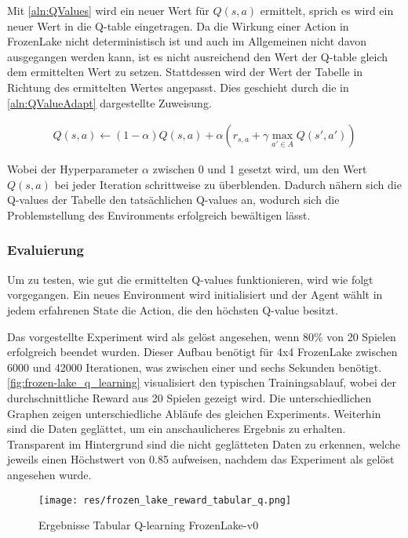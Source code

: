 \documentclass[11pt]{scrartcl}
\begin{document}
Mit \autoref{aln:QValues} wird ein neuer Wert für $Q(s, a)$ ermittelt, sprich es wird ein
neuer Wert in die Q-table eingetragen. Da die Wirkung einer Action in FrozenLake nicht
deterministisch ist und auch im Allgemeinen nicht davon ausgegangen werden kann, ist es
nicht ausreichend den Wert der Q-table gleich dem ermittelten Wert zu setzen. Stattdessen
wird der Wert der Tabelle in Richtung des ermittelten Wertes angepasst. Dies geschieht durch 
die in \autoref{aln:QValueAdapt} dargestellte Zuweisung.

\begin{align}
  Q(s, a) \leftarrow (1 - \alpha)Q(s, a) +
  \alpha(r_{s, a} + \gamma \max_{a'\in A}Q(s', a'))
\label{aln:QValueAdapt}
\end{align}
\noindent

Wobei der Hyperparameter $\alpha$ zwischen 0 und 1 gesetzt wird, um den Wert $Q(s, a)$ bei
jeder Iteration schrittweise zu überblenden. Dadurch nähern sich die Q-values der Tabelle
den tatsächlichen Q-values an, wodurch sich die Problemstellung des Environments erfolgreich 
bewältigen lässt.

\subsubsection{Evaluierung}
Um zu testen, wie gut die ermittelten Q-values funktionieren, wird wie folgt vorgegangen.
Ein neues Environment wird initialisiert und der Agent wählt in jedem erfahrenen State die
Action, die den höchsten Q-value besitzt.

Das vorgestellte Experiment wird als gelöst angesehen, wenn 80\% von 20 Spielen erfolgreich
beendet wurden. Dieser Aufbau benötigt für 4x4 FrozenLake zwischen 6000 und 42000
Iterationen, was zwischen einer und sechs Sekunden benötigt.
\autoref{fig:frozen-lake_q_learning} visualisiert den typischen Trainingsablauf, wobei der
durchschnittliche Reward aus 20 Spielen gezeigt wird. Die unterschiedlichen Graphen zeigen
unterschiedliche Abläufe des gleichen Experiments. Weiterhin sind die Daten geglättet, um
ein anschaulicheres Ergebnis zu erhalten. Transparent im Hintergrund sind die nicht
geglätteten Daten zu erkennen, welche jeweils einen Höchstwert von 0.85 aufweisen, nachdem
das Experiment als gelöst angesehen wurde.
\begin{figure}[htp]
\centering
\texttt{[image: res/frozen\_lake\_reward\_tabular\_q.png]}
\caption{Ergebnisse Tabular Q-learning FrozenLake-v0}
\label{fig:frozen-lake_q_learning}
\end{figure}
\end{document}
